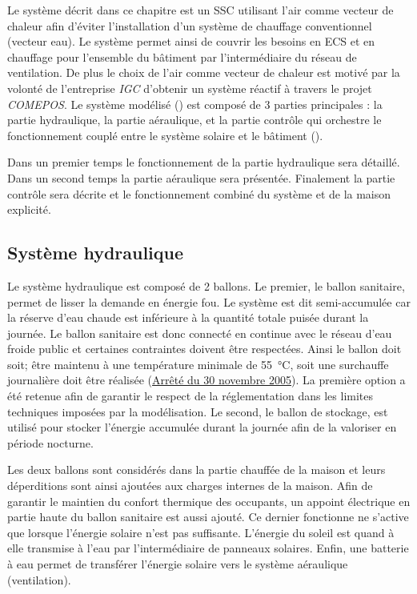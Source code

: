 Le système décrit dans ce chapitre est un SSC utilisant l’air comme vecteur de chaleur
afin d’éviter l’installation d’un système de chauffage conventionnel (vecteur eau). Le
système permet ainsi de couvrir les besoins en ECS et en chauffage pour l’ensemble du
bâtiment par l’intermédiaire du réseau de ventilation. De plus le choix de l’air comme
vecteur de chaleur est motivé par la volonté de l’entreprise \emph{IGC} d’obtenir un
système réactif à travers le projet \textit{COMEPOS}.
Le système modélisé () est composé de 3 parties principales : la partie
hydraulique, la partie aéraulique, et la partie contrôle qui orchestre le fonctionnement
couplé entre le système solaire et le bâtiment ().


Dans un premier temps le fonctionnement de la partie hydraulique sera détaillé. Dans un
second temps la partie aéraulique sera présentée. Finalement la partie contrôle sera
décrite et le fonctionnement combiné du système et de la maison explicité.

\subsection{Système hydraulique} %
\label{sub:systeme_hydraulique}
Le système hydraulique est composé de 2 ballons. Le premier, le ballon sanitaire, permet
de lisser la demande en énergie fou. Le système est dit semi-accumulée car la réserve
d’eau chaude est inférieure à la quantité totale puisée durant la journée. Le ballon
sanitaire est donc connecté en continue avec le réseau d’eau froide public et certaines
contraintes doivent être respectées. Ainsi le ballon doit soit; être maintenu à une
température minimale de
\SI{55}{\celsius}, soit une surchauffe journalière doit être réalisée
(\href{https://www.legifrance.gouv.fr/affichTexte.do?cidTexte=JORFTEXT000000423756}{Arrêté
du 30 novembre 2005}). La première option a été retenue afin de garantir le respect de la
réglementation dans les limites techniques imposées par la modélisation. Le second, le
ballon de stockage, est utilisé pour stocker l’énergie accumulée durant la journée afin de
la valoriser en période nocturne.

Les deux ballons sont considérés dans la partie chauffée de la maison et leurs
déperditions sont ainsi ajoutées aux charges internes de la maison. Afin de garantir le
maintien du confort thermique des occupants, un appoint électrique en partie haute du
ballon sanitaire est aussi ajouté. Ce dernier fonctionne ne s’active que lorsque l’énergie
solaire n’est pas suffisante. L’énergie du soleil est quand à elle transmise à l’eau par
l’intermédiaire de panneaux solaires. Enfin, une batterie à eau permet de transférer
l’énergie solaire vers le système aéraulique (ventilation).

